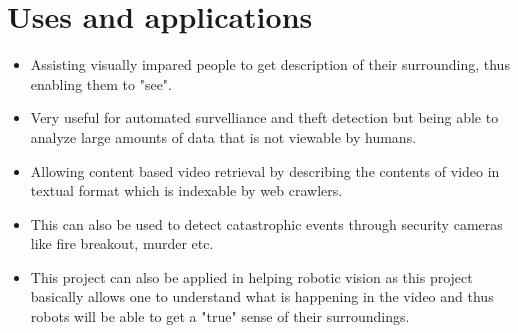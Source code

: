 \documentclass{article}
\begin{document}
	\section{Uses and applications}
			\begin{itemize}
				\item
					Assisting visually impared people to get description of their surrounding, thus enabling them to "see".
				\item
					Very useful for automated survelliance and theft detection but being able to analyze large amounts of data that is not viewable by humans.
				\item
					Allowing content based video retrieval by describing the contents of video in textual format which is indexable by web crawlers.
				\item
					This can also be used to detect catastrophic events through security cameras like fire breakout, murder etc.
				\item
					This project can also be applied in helping robotic vision as this project basically allows one to understand what is happening in the video and thus robots will be able to get a "true" sense of their surroundings.
			\end{itemize}
\end{document}
